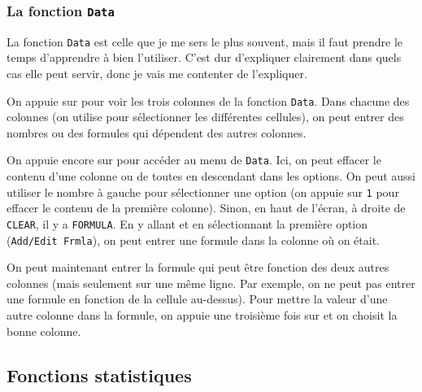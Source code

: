\subsubsection{La fonction \texttt{Data}}
La fonction \texttt{Data} est celle que je me sers le plus souvent, mais il faut prendre le temps d'apprendre à bien l'utiliser. C'est dur d'expliquer clairement dans quels cas elle peut servir, donc je vais me contenter de l'expliquer.

On appuie sur  pour voir les trois colonnes de la fonction \texttt{Data}. Dans chacune des colonnes (on utilise  pour sélectionner les différentes cellules), on peut entrer des nombres ou des formules qui dépendent des autres colonnes.

On appuie encore sur  pour accéder au menu de \texttt{Data}. Ici, on peut effacer le contenu d'une colonne ou de toutes en descendant dans les options. On peut aussi utiliser le nombre à gauche pour sélectionner une option (on appuie sur \texttt{1} pour effacer le contenu de la première colonne). Sinon, en haut de l'écran, à droite de \texttt{CLEAR}, il y a \texttt{FORMULA}. En y allant et en sélectionnant la première option (\texttt{Add/Edit Frmla}), on peut entrer une formule dans la colonne où on était. 

On peut maintenant entrer la formule qui peut être fonction des deux autres colonnes (mais seulement sur une même ligne. Par exemple, on ne peut pas entrer une formule en fonction de la cellule au-dessus). Pour mettre la valeur d'une autre colonne dans la formule, on appuie une troisième fois sur  et on choisit la bonne colonne.

\subsection{Fonctions statistiques}

